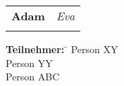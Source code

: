 \documentclass{scrartcl}
\newcommand{\zwei}[2]
{\begin{tabular}{|>{\bfseries}c|>{\itshape}c|}
 \firsthline
  #1&#2\\
 \lasthline
 \end{tabular}}
\begin{document}
\zwei{Adam}{Eva}


\newenvironment{tabenv}[1]{\begin{itshape}
\begin{tabbing}
\textup{\bfseries #1:} \=\+}
{\end{tabbing}
\end{itshape}}


\begin{tabenv}{Teilnehmer}
Person XY\\
Person YY\\
Person 	ABC\\
\end{tabenv}
\end{document}
